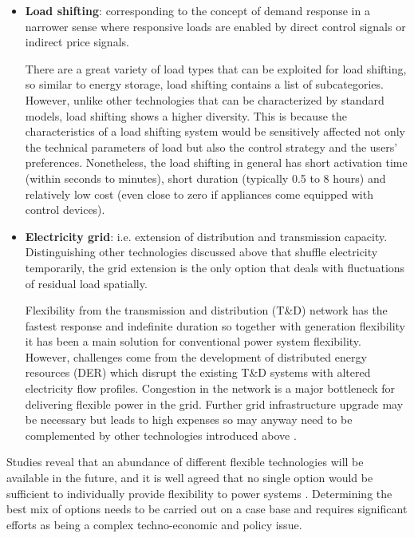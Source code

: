 \begin{itemize}
	\item \textbf{Load shifting}: corresponding to the concept of demand response in a narrower sense where responsive loads are enabled by direct control signals or indirect price signals.
	
	There are a great variety of load types that can be exploited for load shifting, so similar to energy storage, load shifting contains a list of subcategories. However, unlike other technologies that can be characterized by standard models, load shifting shows a higher diversity. This is because the characteristics of a load shifting system would be sensitively affected not only the technical parameters of load but also the control strategy and the users' preferences. Nonetheless, the load shifting in general has short activation time (within seconds to minutes), short duration (typically 0.5 to 8 hours) and relatively low cost (even close to zero if appliances come equipped with control devices). 

	\item \textbf{Electricity grid}: i.e. extension of distribution and transmission capacity. Distinguishing other technologies discussed above that shuffle electricity temporarily, the grid extension is the only option that deals with fluctuations of residual load spatially. %
	
	Flexibility from the transmission and distribution (T\&D) network has the fastest response and indefinite duration so together with generation flexibility it has been a main solution for conventional power system flexibility. However, challenges come from the development of distributed energy resources (DER) which disrupt the existing T\&D systems with altered electricity flow profiles. Congestion in the network is a major bottleneck for delivering flexible power in the grid. Further grid infrastructure upgrade may be necessary but leads to high expenses so may anyway need to be complemented by other technologies introduced above \cite{Cochran2014}.
	
\end{itemize}

Studies reveal that an abundance of different flexible technologies will be available in the future, and it is well agreed that no single option would be sufficient to individually provide flexibility to power systems \cite{Cochran2014,Wang2017,Lund2015,Muller2016}. Determining the best mix of options needs to be carried out on a case base and requires significant efforts as being a complex techno-economic and policy issue. 

